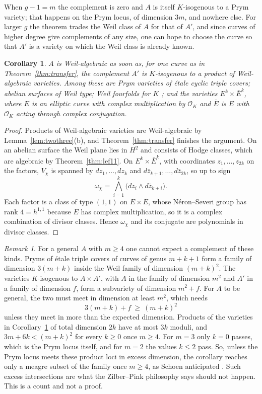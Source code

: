 \documentclass[11pt]{amsart}
\newtheorem{corollary}[theorem]{Corollary}
\theoremstyle{definition}
\theoremstyle{remark}
\newtheorem{remark}[theorem]{Remark}
\newcommand{\cO}{\mathcal{O}}
\begin{document}
When $g-1=m$ the complement is zero and $A$ is itself $K$-isogenous to a
Prym variety; that happens on the Prym locus, of dimension $3m$, and nowhere
else. For larger $g$ the theorem trades the Weil class of $A$ for that of
$A'$, and since curves of higher degree give complements of any size, one
can hope to choose the curve so that $A'$ is a variety on which the Weil
class is already known.

\begin{corollary}\label{cor:transfer}
$A$ is Weil-algebraic as soon as, for one curve as in
Theorem~\ref{thm:transfer}, the complement $A'$ is $K$-isogenous to a product
of Weil-algebraic varieties. Among these are Prym varieties of \'etale cyclic
triple covers; abelian surfaces of Weil type; Weil fourfolds for $K$
\cite{Sch88,Sch98}; and the varieties $E^{k}\times\bar E^{k}$, where $E$ is an
elliptic curve with complex multiplication by $\cO_{K}$ and $\bar E$ is $E$
with $\cO_{K}$ acting through complex conjugation.
\end{corollary}

\begin{proof}
Products of Weil-algebraic varieties are Weil-algebraic by
Lemma~\ref{lem:twothree}(b), and Theorem~\ref{thm:transfer} finishes the
argument. On an abelian surface the Weil plane lies in $H^{2}$ and consists of
Hodge classes, which are algebraic by Theorem~\ref{thm:lef11}. On
$E^{k}\times\bar E^{k}$, with coordinates $z_{1},\dots,z_{2k}$ on the factors,
$V_{\chi}$ is spanned by $dz_{1},\dots,dz_{k}$ and
$d\bar z_{k+1},\dots,d\bar z_{2k}$, so up to sign
\[
  \omega_{\chi}=\bigwedge_{i=1}^{k}\bigl(dz_{i}\wedge d\bar z_{k+i}\bigr).
\]
Each factor is a class of type $(1,1)$ on $E\times\bar E$, whose N\'eron--Severi
group has rank $4=h^{1,1}$ because $E$ has complex multiplication, so it is a
complex combination of divisor classes. Hence $\omega_{\chi}$ and its
conjugate are polynomials in divisor classes.
\end{proof}

\begin{remark}\label{rem:count}
For a general $A$ with $m\ge4$ one cannot expect a complement of these
kinds. Pryms of \'etale triple covers of curves of genus $m+k+1$ form a
family of dimension $3(m+k)$ inside the Weil family of dimension $(m+k)^{2}$.
The varieties $K$-isogenous to $A\times A'$, with $A$ in the family of
dimension $m^{2}$ and $A'$ in a family of dimension $f$, form a subvariety of
dimension $m^{2}+f$. For $A$ to be general, the two must meet in dimension at
least $m^{2}$, which needs
\[
  3(m+k)+f\ \ge\ (m+k)^{2}
\]
unless they meet in more than the expected dimension. Products of the
varieties in Corollary~\ref{cor:transfer} of total dimension $2k$ have at most
$3k$ moduli, and $3m+6k<(m+k)^{2}$ for every $k\ge0$ once $m\ge4$. For
$m=3$ only $k=0$ passes, which is the Prym locus itself, and for $m=2$ the
values $k\le2$ pass. So, unless the Prym locus meets these product loci in
excess dimension, the corollary reaches only a meagre subset of the family
once $m\ge4$, as Schoen anticipated \cite[Section~3]{Sch88}. Such excess
intersections are what the Zilber--Pink philosophy says should not happen.
This is a count and not a proof.
\end{remark}
\end{document}
